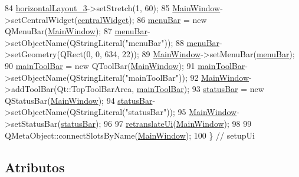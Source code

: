 \begin{DoxyCode}
84         \mbox{\hyperlink{class_ui___main_window_a03ce63974cc69b067c91bbf285cceca8}{horizontalLayout\_3}}->setStretch(1, 60);
85         \mbox{\hyperlink{class_main_window}{MainWindow}}->setCentralWidget(\mbox{\hyperlink{class_ui___main_window_a30075506c2116c3ed4ff25e07ae75f81}{centralWidget}});
86         \mbox{\hyperlink{class_ui___main_window_a2be1c24ec9adfca18e1dcc951931457f}{menuBar}} = \textcolor{keyword}{new} QMenuBar(\mbox{\hyperlink{class_main_window}{MainWindow}});
87         \mbox{\hyperlink{class_ui___main_window_a2be1c24ec9adfca18e1dcc951931457f}{menuBar}}->setObjectName(QStringLiteral(\textcolor{stringliteral}{"menuBar"}));
88         \mbox{\hyperlink{class_ui___main_window_a2be1c24ec9adfca18e1dcc951931457f}{menuBar}}->setGeometry(QRect(0, 0, 634, 22));
89         \mbox{\hyperlink{class_main_window}{MainWindow}}->setMenuBar(\mbox{\hyperlink{class_ui___main_window_a2be1c24ec9adfca18e1dcc951931457f}{menuBar}});
90         \mbox{\hyperlink{class_ui___main_window_a5172877001c8c7b4e0f6de50421867d1}{mainToolBar}} = \textcolor{keyword}{new} QToolBar(\mbox{\hyperlink{class_main_window}{MainWindow}});
91         \mbox{\hyperlink{class_ui___main_window_a5172877001c8c7b4e0f6de50421867d1}{mainToolBar}}->setObjectName(QStringLiteral(\textcolor{stringliteral}{"mainToolBar"}));
92         \mbox{\hyperlink{class_main_window}{MainWindow}}->addToolBar(Qt::TopToolBarArea, \mbox{\hyperlink{class_ui___main_window_a5172877001c8c7b4e0f6de50421867d1}{mainToolBar}});
93         \mbox{\hyperlink{class_ui___main_window_a50fa481337604bcc8bf68de18ab16ecd}{statusBar}} = \textcolor{keyword}{new} QStatusBar(\mbox{\hyperlink{class_main_window}{MainWindow}});
94         \mbox{\hyperlink{class_ui___main_window_a50fa481337604bcc8bf68de18ab16ecd}{statusBar}}->setObjectName(QStringLiteral(\textcolor{stringliteral}{"statusBar"}));
95         \mbox{\hyperlink{class_main_window}{MainWindow}}->setStatusBar(\mbox{\hyperlink{class_ui___main_window_a50fa481337604bcc8bf68de18ab16ecd}{statusBar}});
96 
97         \mbox{\hyperlink{class_ui___main_window_a097dd160c3534a204904cb374412c618}{retranslateUi}}(\mbox{\hyperlink{class_main_window}{MainWindow}});
98 
99         QMetaObject::connectSlotsByName(\mbox{\hyperlink{class_main_window}{MainWindow}});
100     \} \textcolor{comment}{// setupUi}
\end{DoxyCode}


\subsection{Atributos}
\mbox{\label{class_ui___main_window_a30075506c2116c3ed4ff25e07ae75f81}} 

